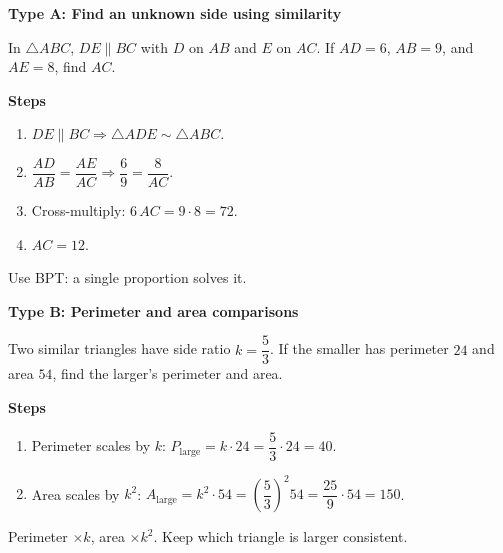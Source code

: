 \documentclass[11pt,a4paper]{article}
\begin{document}
\begin{examplebox}
\textbf{Type A: Find an unknown side using similarity}

In $\triangle ABC$, $DE\parallel BC$ with $D$ on $AB$ and $E$ on $AC$. If $AD=6$, $AB=9$, and $AE=8$, find $AC$.

\begin{center}
\end{center}

\textbf{Steps}
\begin{enumerate}
  \item $DE\parallel BC \Rightarrow \triangle ADE \sim \triangle ABC$.
  \item $\dfrac{AD}{AB} = \dfrac{AE}{AC} \Rightarrow \dfrac{6}{9} = \dfrac{8}{AC}$.
  \item Cross-multiply: $6\,AC = 9\cdot 8 = 72$.
  \item $AC = 12$.
\end{enumerate}

\begin{shortcutbox}
Use BPT: a single proportion solves it.
\end{shortcutbox}
\end{examplebox}

\begin{examplebox}
\textbf{Type B: Perimeter and area comparisons}

Two similar triangles have side ratio $k=\dfrac{5}{3}$. If the smaller has perimeter $24$ and area $54$, find the larger's perimeter and area.

\textbf{Steps}
\begin{enumerate}
  \item Perimeter scales by $k$: $P_{\text{large}} = k\cdot 24 = \dfrac{5}{3}\cdot 24 = 40$.
  \item Area scales by $k^2$: $A_{\text{large}} = k^2\cdot 54 = \left(\dfrac{5}{3}\right)^2 54 = \dfrac{25}{9}\cdot 54 = 150$.
\end{enumerate}

\begin{shortcutbox}
Perimeter $\times k$, area $\times k^2$. Keep which triangle is larger consistent.
\end{shortcutbox}
\end{examplebox}
\end{document}
